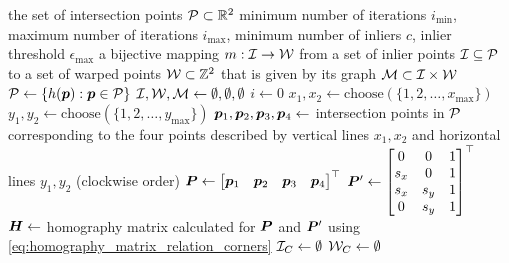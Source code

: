\documentclass[../report.tex]{subfiles}
\begin{document}
\begin{algorithm}
    \begin{algorithmic}[1]
        \Input the set of intersection points ${\mathcal{P}} \subset \mathbb{R}^2$
        \Parameters minimum number of iterations $i_\text{min}$, maximum number of iterations $i_\text{max}$, minimum number of inliers $c$, inlier threshold $\epsilon_\text{max}$
        \Output a bijective mapping $m : {\mathcal{I}} \to {\mathcal{W}}$ from a set of inlier points ${\mathcal{I}} \subseteq {\mathcal{P}}$ to a set of warped points ${\mathcal{W}} \subset \mathbb{Z}^2$ that is given by its graph ${\mathcal{M}} \subset {\mathcal{I}} \times {\mathcal{W}}$
        \State ${\mathcal{P}} \gets \{h({\bm{p}}) : {\bm{p}} \in {\mathcal{P}}\}$ 
        \State ${\mathcal{I}}, {\mathcal{W}}, {\mathcal{M}} \gets \emptyset, \emptyset, \emptyset$ 
        \State $i \gets 0$ 
            \State $x_1,x_2 \gets \text{choose}(\{1, 2, \dots, x_\text{max}\})$ 
            \State $y_1,y_2 \gets \text{choose}(\{1, 2, \dots, y_\text{max}\})$ 
            \State ${\bm{p}}_1,{\bm{p}}_2,{\bm{p}}_3,{\bm{p}}_4 \gets$ intersection points in ${\mathcal{P}}$ corresponding to the four points described by vertical lines $x_1,x_2$ and horizontal lines $y_1,y_2$ (clockwise order)
            \State ${\bm{P}} \gets \begin{bmatrix}
                {\bm{p}}_1 & {\bm{p}}_2 & {\bm{p}}_3 & {\bm{p}}_4
            \end{bmatrix}^\top$ 
                \label{alg:ransac:for_sx}
                    \label{alg:ransac:for_sy}
                    \State ${\bm{P}}' \gets \begin{bmatrix}
                        0 & 0 & 1 \\
                        s_x & 0 & 1 \\
                        s_x & s_y & 1 \\
                        0 & s_y & 1
                    \end{bmatrix}^\top$ 
                    \State ${\bm{H}} \gets$ homography matrix calculated for ${\bm{P}}$ and ${\bm{P}}'$ using \cref{eq:homography_matrix_relation_corners}
                        \label{alg:ransac:compute_homography}
                    \State ${\mathcal{I}}_C \gets \emptyset$ 
                    \State ${\mathcal{W}}_C \gets \emptyset$ 

\end{algorithmic}
\end{algorithm}
\end{document}
